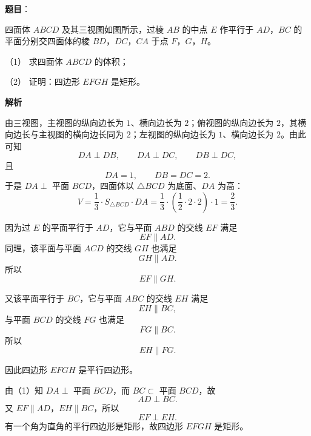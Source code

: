 \begin{answer}

\textbf{题目}：

四面体 $ABCD$ 及其三视图如图所示，过棱 $AB$ 的中点 $E$ 作平行于 $AD$，$BC$ 的平面分别交四面体的棱 $BD$，$DC$，$CA$ 于点 $F$，$G$，$H$。
\nopagebreak[4]
\begin{center}\end{center}
\nopagebreak[4]
（1） 求四面体 $ABCD$ 的体积；

（2） 证明：四边形 $EFGH$ 是矩形。

\textbf{解析}


由三视图，主视图的纵向边长为 $1$、横向边长为 $2$；俯视图的纵向边长为 $2$，其横向边长与主视图的横向边长同为 $2$；左视图的纵向边长为 $1$、横向边长为 $2$。由此可知
\nopagebreak[4]
\[DA\perp DB,\qquad DA\perp DC,\qquad DB\perp DC,\]
且
\nopagebreak[4]
\[DA=1,\qquad DB=DC=2.\]
于是 $DA\perp$ 平面 $BCD$，四面体以 $\triangle BCD$ 为底面、$DA$ 为高：
\nopagebreak[4]
\[V=\frac13\cdot S_{\triangle BCD}\cdot DA
=\frac13\cdot\left(\frac12\cdot2\cdot2\right)\cdot1
=\frac23.\]


因为过 $E$ 的平面平行于 $AD$，它与平面 $ABD$ 的交线 $EF$ 满足
\nopagebreak[4]
\[EF\parallel AD.\]
同理，该平面与平面 $ACD$ 的交线 $GH$ 也满足
\nopagebreak[4]
\[GH\parallel AD.\]
所以
\nopagebreak[4]
\[EF\parallel GH.\]

又该平面平行于 $BC$，它与平面 $ABC$ 的交线 $EH$ 满足
\nopagebreak[4]
\[EH\parallel BC,\]
与平面 $BCD$ 的交线 $FG$ 也满足
\nopagebreak[4]
\[FG\parallel BC.\]
所以
\nopagebreak[4]
\[EH\parallel FG.\]

因此四边形 $EFGH$ 是平行四边形。

由（1）知 $DA\perp$ 平面 $BCD$，而 $BC\subset$ 平面 $BCD$，故
\nopagebreak[4]
\[AD\perp BC.\]
又 $EF\parallel AD$，$EH\parallel BC$，所以
\nopagebreak[4]
\[EF\perp EH.\]
有一个角为直角的平行四边形是矩形，故四边形 $EFGH$ 是矩形。



\end{answer}
